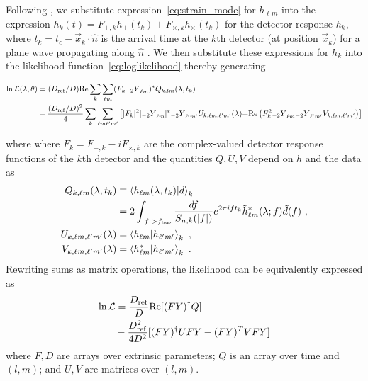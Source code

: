 \documentclass[twocolumn,prd,nofootinbib]{revtex4}
\newcommand\qmstateproduct[2]{\left\langle#1|#2\right\rangle}
\newcommand\Y[1]{{{}_{#1}Y}}
\begin{document}
Following \citet{gwastro-PE-AlternativeArchitectures}, we substitute expression~\eqref{eq:strain_mode} 
for $h_{\ell m}$ into the expression $h_k(t) =F_{+,k} h_+(t_k) +
  F_{\times,k}h_\times(t_k)$ for the detector response $h_k$, 
where $t_k=t_c - \vec{x}_k \cdot \hat{n}$ is the arrival time at the $k$th detector (at position $\vec{x}_k$)
for a plane wave propagating along $\hat{n}$ \cite{gwastro-PE-AlternativeArchitectures}.
We then substitute these expressions for $h_k$ into the likelihood function~\eqref{eq:loglikelihood}
thereby generating~\cite{gwastro-PE-AlternativeArchitectures}
\begin{widetext}
\begin{align}
\ln {\cal L}(\lambda, \theta) 
&= (D_{\rm ref}/D) \text{Re} \sum_k \sum_{\ell m}(F_k \Y{-2}_{\ell m})^* Q_{k,lm}(\lambda,t_k)\nonumber \\
&   -\frac{(D_{\rm ref}/D)^2}{4}\sum_k \sum_{\ell m \ell' m'}
\left[
{
|F_k|^2 [\Y{-2}_{\ell m}]^*\Y{-2}_{\ell'm'} U_{k,\ell m,\ell' m'}(\lambda)
}
 {
+  \text{Re} \left( F_k^2 \Y{-2}_{\ell m} \Y{-2}_{\ell'm'} V_{k,\ell m,\ell'm'} \right)
}
\right]
\label{eq:def:lnL:Decomposed}
\end{align}
\end{widetext}
where 
 where $F_k = F_{+,k} - i F_{\times,k}$ are the
complex-valued detector
response functions of the $k$th detector \cite{gwastro-PE-AlternativeArchitectures} and 
the quantities $Q,U,V$ depend on $h$ and the data as
\begin{subequations}
\label{eq:QUV}
\begin{align}
Q_{k,\ell m}(\lambda,t_k) &\equiv \qmstateproduct{h_{\ell m}(\lambda,t_k)}{d}_k \nonumber\\
&= 2 \int_{|f|>f_{\rm low}} \frac{df}{S_{n,k}(|f|)} e^{2\pi i f t_k} \tilde{h}_{\ell m}^*(\lambda;f) \tilde{d}(f)\ , \\
{ U_{k,\ell m,\ell' m'}(\lambda)}& = \qmstateproduct{h_{\ell m}}{h_{\ell'm'}}_k\ , \\
V_{k,\ell m,\ell' m'}(\lambda)& = \qmstateproduct{h_{\ell m}^*}{h_{\ell'm'}}_k  \ .
\end{align}
\end{subequations}
Rewriting sums as matrix operations, the likelihood can be equivalently expressed as
\begin{align}
\ln {\cal L} &= \frac{D_{\rm ref}}{D} \text{Re}[ (F Y)^\dag Q]  \nonumber \\
 & - \frac{D_{\rm ref}^2}{4 D^2} [ (FY)^\dag U FY + (FY)^TV FY]
\label{eq:lnL:MatrixForm}
\end{align}
where $F,D$ are arrays over extrinsic parameters; $Q$ is an array over time and $(l,m)$; and $U,V$ are matrices over
$(l,m)$. 
\end{document}
